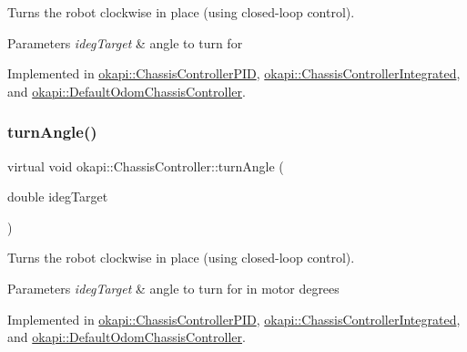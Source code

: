 Turns the robot clockwise in place (using closed-\/loop control).


\begin{DoxyParams}{Parameters}
{\em ideg\+Target} & angle to turn for \\
\hline
\end{DoxyParams}


Implemented in \mbox{\hyperlink{classokapi_1_1ChassisControllerPID_a56aae5a15daa9ed81963dd48fce69535}{okapi\+::\+Chassis\+Controller\+P\+ID}}, \mbox{\hyperlink{classokapi_1_1ChassisControllerIntegrated_a3c2ae782167fd9c6b27d637563e3a066}{okapi\+::\+Chassis\+Controller\+Integrated}}, and \mbox{\hyperlink{classokapi_1_1DefaultOdomChassisController_a4ba07ac4bea9ff2d8aea30be72f6a0ea}{okapi\+::\+Default\+Odom\+Chassis\+Controller}}.

\mbox{\label{classokapi_1_1ChassisController_a6aca227e35ececd02eed1cc42d09ad1d}} 
\subsubsection{\texorpdfstring{turnAngle()}{turnAngle()}\hspace{0.1cm}{\footnotesize\ttfamily [2/2]}}
{\footnotesize\ttfamily virtual void okapi\+::\+Chassis\+Controller\+::turn\+Angle (\begin{DoxyParamCaption}\item[{double}]{ideg\+Target }\end{DoxyParamCaption})\hspace{0.3cm}{\ttfamily [pure virtual]}}

Turns the robot clockwise in place (using closed-\/loop control).


\begin{DoxyParams}{Parameters}
{\em ideg\+Target} & angle to turn for in motor degrees \\
\hline
\end{DoxyParams}


Implemented in \mbox{\hyperlink{classokapi_1_1ChassisControllerPID_a140679da584fdc8bd057678e277742e7}{okapi\+::\+Chassis\+Controller\+P\+ID}}, \mbox{\hyperlink{classokapi_1_1ChassisControllerIntegrated_a3f13749508bf420468ffdb54f62a9da2}{okapi\+::\+Chassis\+Controller\+Integrated}}, and \mbox{\hyperlink{classokapi_1_1DefaultOdomChassisController_a05a8a6684b3afe4f7c2ecbc24699f70d}{okapi\+::\+Default\+Odom\+Chassis\+Controller}}.

